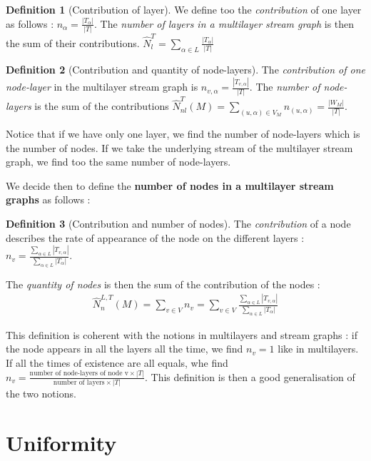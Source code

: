 \documentclass[dvipsnames,a4paper,11pt]{article}
\theoremstyle{definition}
\newtheorem{defn}{Definition}
\theoremstyle{remark}
\theoremstyle{remark}
\begin{document}
	
	\begin{defn}[Contribution of layer]
	We define too the {\em contribution} of one layer as follows : $n_\alpha = \frac{|T_{\alpha}|}{|T|}$. The {\em number of layers in a multilayer stream graph} is then the sum of their contributions. $\hat{N}^T_l = \sum_{\alpha \in L}\frac{ |T_{\alpha}|}{|T|}$
    \end{defn}
	
	\begin{defn}[Contribution and quantity of node-layers]
	The {\em contribution of one node-layer} in the multilayer stream graph is $n_{v,\alpha} = \frac{|T_{v,\alpha}|}{|T|}$. The {\em number of node-layers} is the sum of the contributions $\hat{N}^{T}_{nl}(M) = \underset{(u,\alpha)\in V_M}{\sum} n_{(u,\alpha)} = \frac{|W_M|}{|T|}$.
    \end{defn}
	
	Notice that if we have only one layer, we find the number of node-layers which is the number of nodes. If we take the underlying stream of the multilayer stream graph, we find too the same number of node-layers.

    
    We decide then to define the \textbf{number of nodes in a multilayer stream graphs} as follows : 
    
    \begin{defn}[Contribution and number of nodes]
    The {\em contribution} of a node describes the rate of appearance of the node on the different layers : $n_v = \frac{\sum_{\alpha \in L}|T_{v,\alpha}|}{\sum_{\alpha \in L} |T_{\alpha}|}$.
    
    The {\em quantity of nodes} is then the sum of the contribution of the nodes : 
    \begin{align}
    \hat{N}^{L,T}_n(M) = \sum_{v\in V} n_v= \sum_{v\in V} \frac{\sum_{\alpha \in L}|T_{v,\alpha}|}{\sum_{\alpha \in L} |T_{\alpha}|} 
    \label{numberNodes}
	\end{align}     
	
	\end{defn}
	
	This definition is coherent with the notions in multilayers and stream graphs : if the node appears in all the layers all the time, we find $n_v = 1$ like in multilayers. If all the times of existence are all equals, whe find $n_v=\frac{\text{number of node-layers of node v}\times |T|}{\text{number of layers}\times |T|}$. This definition is then a good generalisation of the two notions.
	
	\section{Uniformity}
	
\end{document}
